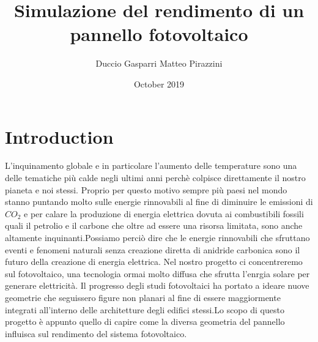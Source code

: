 \documentclass{article}
\title{Simulazione del rendimento di un pannello fotovoltaico}
\author{Duccio Gasparri Matteo Pirazzini}
\date{October 2019}
\begin{document}
\maketitle

\section{Introduction}
  L'inquinamento globale e in particolare l'aumento delle temperature sono una delle tematiche più calde negli ultimi anni perchè colpisce direttamente il nostro pianeta e noi stessi. Proprio per questo motivo sempre più paesi nel mondo stanno puntando molto sulle energie rinnovabili al fine di diminuire le emissioni di $CO_{2}$ e per calare la produzione di energia elettrica dovuta ai combustibili fossili quali il petrolio e il carbone che oltre ad essere una risorsa limitata, sono anche altamente inquinanti.Possiamo perciò dire che le energie rinnovabili che sfruttano eventi e fenomeni naturali senza creazione diretta di anidride carbonica sono il futuro della creazione di energia elettrica. Nel nostro progetto ci concentreremo sul fotovoltaico, una tecnologia ormai molto diffusa che sfrutta l'enrgia solare per generare elettricità.
  Il progresso degli studi fotovoltaici ha portato a ideare nuove geometrie che seguissero figure non planari al fine di essere maggiormente integrati all'interno delle architetture degli  edifici stessi.Lo scopo di questo progetto è appunto quello di capire come la diversa geometria del pannello influisca sul rendimento del sistema fotovoltaico.
\end{document}
